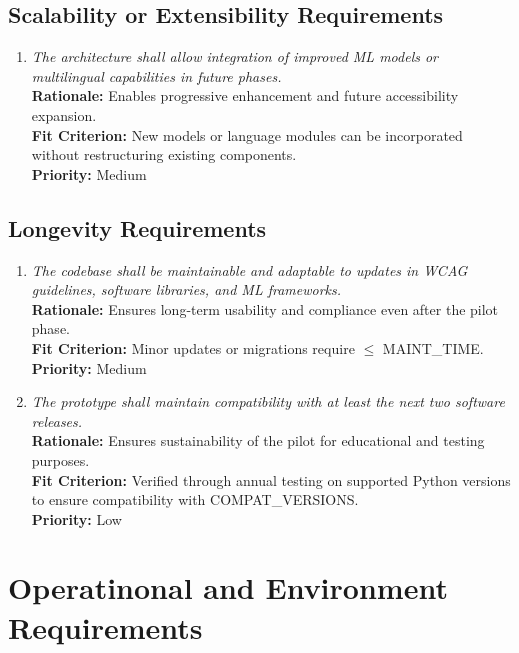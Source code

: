 \documentclass[12pt]{article}
\begin{document}
\subsection{Scalability or Extensibility Requirements}
\begin{enumerate}[label=PR-SER \arabic*., wide=0pt, leftmargin=*]
\item \emph{The architecture shall allow integration of improved ML models or multilingual capabilities in future phases.}\\[2mm] 
    {\bf Rationale:} Enables progressive enhancement and future accessibility expansion.\\
    {\bf Fit Criterion:} New models or language modules can be incorporated without restructuring existing components.\\
    {\bf Priority:} Medium
\end{enumerate}

\subsection{Longevity Requirements}
\begin{enumerate}[label=PR-LR \arabic*., wide=0pt, leftmargin=*]
\item \emph{The codebase shall be maintainable and adaptable to updates in WCAG guidelines, software libraries, and ML frameworks.}\\[2mm] 
    {\bf Rationale:} Ensures long-term usability and compliance even after the pilot phase.\\
    {\bf Fit Criterion:} Minor updates or migrations require $\leq$ MAINT\_TIME.\\
    {\bf Priority:} Medium

\item \emph{The prototype shall maintain compatibility with at least the next two software releases.}\\[2mm] 
    {\bf Rationale:} Ensures sustainability of the pilot for educational and testing purposes.\\
    {\bf Fit Criterion:} Verified through annual testing on supported Python versions to ensure compatibility with COMPAT\_VERSIONS.\\
    {\bf Priority:} Low
\end{enumerate}


\section{Operatinonal and Environment Requirements}
\end{document}
